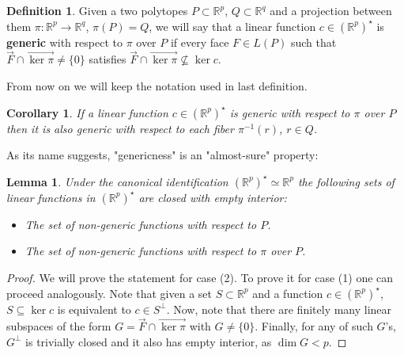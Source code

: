 \documentclass[10pt,a4paper]{article}
\newcommand{\RR}{\mathbb{R}}
\theoremstyle{plain}
\newtheorem{lemma}{Lemma}
\newtheorem{corollary}{Corollary}
\theoremstyle{remark}
\theoremstyle{definition}
\newtheorem{definition}{Definition}
\begin{document}
\begin{definition} 
	Given a two polytopes $P\subset \RR^p$, $Q\subset \RR^q$ 
	and a projection between them $\pi: \RR^p \rightarrow \RR^q$, $\pi(P)=Q$, 
	we will say that a linear function $c\in (\RR^p)^\star$ is \textbf{generic} with respect to $\pi$ over $P$ 
	if every face $F\in L(P)$ such that $\overrightarrow{F}\cap \overrightarrow{\ker \pi} \neq \{0\}$
	satisfies $\overrightarrow{F}\cap \overrightarrow{\ker \pi} \nsubseteq \ker c$.
\end{definition}

From now on we will keep the notation used in last definition. 

\begin{corollary} 
	If a linear function $c\in (\RR^ p)^\star$ is generic with respect to 
	$\pi$ over $P$ then it is also generic with respect to each fiber $\pi^ {-1}(r)$, $r\in Q$.
\end{corollary}


As its name suggests, "genericness" is an "almost-sure" property:

\begin{lemma} 
	Under the canonical identification $(\RR^ p)^\star \simeq \RR ^p$ 
	the following sets of linear functions in $(\RR^ p)^\star$ are closed with empty interior: 
	\begin{itemize}
		\item[(1)] The set of non-generic functions with respect to $P$.
		\item[(2)] The set of non-generic functions with respect to $\pi$ over $P$.
	\end{itemize}
\end{lemma}
\begin{proof}
	We will prove the statement for case (2). 
	To prove it for case (1) one can proceed analogously.
	Note that given a set $S\subset \RR^p$ and a function 
	$c\in (\RR^p)^\star$, $S\subseteq \ker c$ is equivalent to $c\in S^\perp$. 
	Now, note that there are finitely many linear subspaces  of the form 
	$G=\overrightarrow{F}\cap \overrightarrow{\ker \pi}$ with $G\neq \{0\}$.
	Finally, for any of such $G$'s, 
	$G^\perp$ is trivially closed and it also has empty interior, as $\dim G < p$.  
\end{proof}


%
\end{document}
